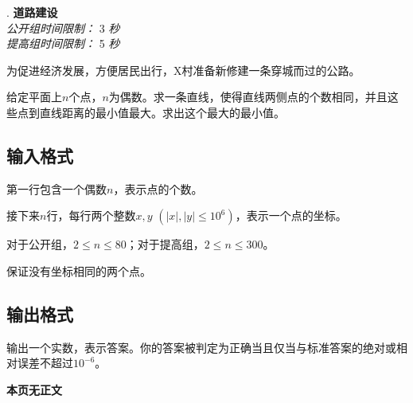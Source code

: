 \addtocounter{ProblemNo}{1}
\renewcommand{\ProblemName}{道路建设}
\begin{center}
\huge{. \textbf{\ProblemName}} \\ [0.8cm]
\large{\textit{公开组时间限制：} 3 \textit{秒}} \\
\large{\textit{提高组时间限制：} 5 \textit{秒}} \\ [0.8cm]
\end{center}

为促进经济发展，方便居民出行，X村准备新修建一条穿城而过的公路。

给定平面上$n$个点，$n$为偶数。求一条直线，使得直线两侧点的个数相同，并且这些点到直线距离的最小值最大。求出这个最大的最小值。

\subsection*{输入格式}

第一行包含一个偶数$n$，表示点的个数。

接下来$n$行，每行两个整数$x, y$ $(|x|, |y| \leq 10^6)$，表示一个点的坐标。

对于公开组，$2 \leq n \leq 80$；对于提高组，$2 \leq n \leq 300$。

保证没有坐标相同的两个点。

\subsection*{输出格式}

输出一个实数，表示答案。你的答案被判定为正确当且仅当与标准答案的绝对或相对误差不超过$10^{-6}$。

\setcounter{ExampleNo}{0}


\clearpage

\ifodd\value{page}
\else
    \vspace*{\fill}
    \begin{center}
    \textbf{\Large 本页无正文}
    \end{center}
    \vspace*{\fill}
    \clearpage
\fi

